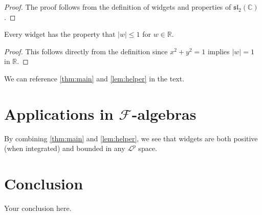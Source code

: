 \documentclass{article}
\begin{document}
\begin{proof}
The proof follows from the definition of widgets and properties of $\mathfrak{sl}_2(\mathbb{C})$.
\end{proof}

\begin{lemma}\label{lem:helper}
Every widget has the property that $|w| \leq 1$ for $w \in \mathbb{R}$.
\end{lemma}

\begin{proof}
This follows directly from the definition since $x^2 + y^2 = 1$ implies $|w| = 1$ in $\mathbb{R}$.
\end{proof}

We can reference \ref{thm:main} and \ref{lem:helper} in the text.


\section{Applications in $\mathcal{F}$-algebras}

By combining \ref{thm:main} and \ref{lem:helper}, we see that widgets are both 
positive (when integrated) and bounded in any $\mathcal{L}^p$ space.

\section{Conclusion}

Your conclusion here.
\end{document}
